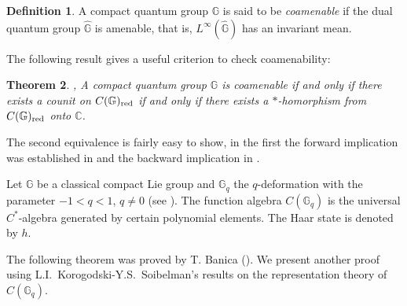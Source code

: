 \documentclass[12pt]{amsart}
\newtheorem{theorem}{Theorem}[section]
\theoremstyle{definition}
\newtheorem{definition}[theorem]{Definition}
\theoremstyle{remark}
\numberwithin{equation}{section}
\begin{document}
\begin{definition} \label{defamen}
A compact quantum group $\mathbb{G}$ is said to be \emph{coamenable} if the dual quantum group $\widehat{\mathbb G}$ is amenable,
that is, $L^\infty(\widehat{\mathbb G})$ has an invariant mean.
\end{definition}

The following result gives a useful criterion to check coamenability:

\begin{theorem}\cite[Theorem 4.7]{bedos+murphy+tuset02}, \cite[Corollary 3.7, Theorem 3.8]{tomatsu06}
A compact quantum group $\mathbb{G}$ is coamenable if and only if there exists a counit on
$C(\mathbb{G})_{\rm red}$ if and only if there exists a $*$-homorphism from $C(\mathbb{G})_{\rm
red}$ onto $\mathbb{C}$. \label{coamequiv}\end{theorem}

The second equivalence is fairly easy to show, in the first the forward implication was established
in \cite{bedos+murphy+tuset02} and the backward implication in \cite{tomatsu06}.

Let $\mathbb{G}$ be a classical compact Lie group and $\mathbb{G}_q$ the $q$-deformation with the
parameter $-1<q<1$, $q\neq0$ (see \cite{korogodski+soibelman98}). The function algebra
$C(\mathbb{G}_q)$ is the universal $C^*$-algebra generated by certain polynomial elements. The Haar
state is denoted by $h$.

The following theorem was proved by T. Banica (\cite[Corollary 6.2]{Banica99}). We present another proof using L.I.\
Korogodski-Y.S.\ Soibelman's results on the representation theory of $C(\mathbb{G}_q)$.
\end{document}
